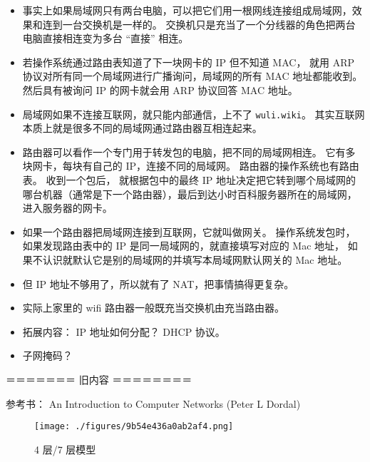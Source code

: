 \begin{itemize}
\item 事实上如果局域网只有两台电脑，可以把它们用一根网线连接组成局域网，效果和连到一台交换机是一样的。 交换机只是充当了一个分线器的角色把两台电脑直接相连变为多台 “直接” 相连。
\item 若操作系统通过路由表知道了下一块网卡的 IP 但不知道 MAC， 就用 ARP 协议对所有同一个局域网进行广播询问，局域网的所有 MAC 地址都能收到。 然后具有被询问 IP 的网卡就会用 ARP 协议回答 MAC 地址。
\item 局域网如果不连接互联网，就只能内部通信，上不了 \verb`wuli.wiki`。 其实互联网本质上就是很多不同的局域网通过路由器互相连起来。
\item 路由器可以看作一个专门用于转发包的电脑，把不同的局域网相连。 它有多块网卡，每块有自己的 IP，连接不同的局域网。 路由器的操作系统也有路由表。 收到一个包后， 就根据包中的最终 IP 地址决定把它转到哪个局域网的哪台机器（通常是下一个路由器），最后到达小时百科服务器所在的局域网， 进入服务器的网卡。
\item 如果一个路由器把局域网连接到互联网，它就叫做网关。 操作系统发包时，如果发现路由表中的 IP 是同一局域网的，就直接填写对应的 Mac 地址， 如果不认识就默认它是别的局域网的并填写本局域网默认网关的 Mac 地址。
\item 但 IP 地址不够用了，所以就有了 NAT，把事情搞得更复杂。
\item 实际上家里的 wifi 路由器一般既充当交换机由充当路由器。
\end{itemize}

\begin{itemize}
\item 拓展内容： IP 地址如何分配？ DHCP 协议。
\item 子网掩码？
\end{itemize}



＝＝＝＝＝＝＝ 旧内容 ＝＝＝＝＝＝＝＝

参考书： An Introduction to Computer Networks (Peter L Dordal)

\begin{figure}[ht]
\centering
\texttt{[image: ./figures/9b54e436a0ab2af4.png]}
\caption{4 层/7 层模型} \label{fig_NetNt_1}
\end{figure}

